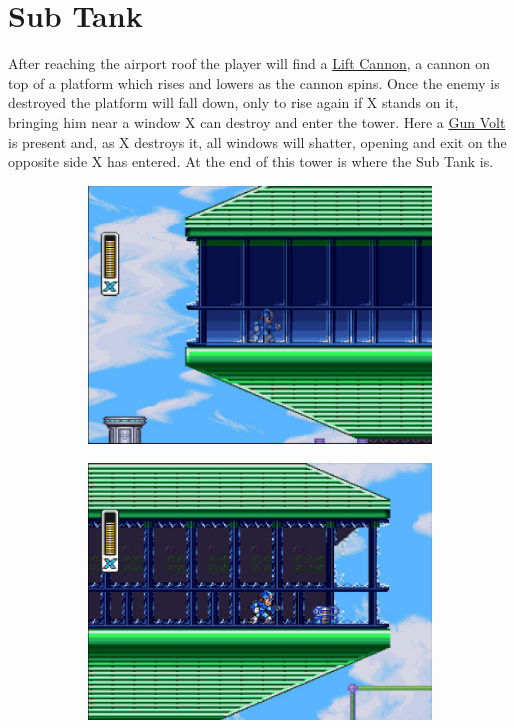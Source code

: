 \section{Sub Tank}
After reaching the airport roof the player will find a 	\hyperlink{enem:Lift_Cannon}{Lift Cannon}, a cannon on top of a platform which rises and lowers as the cannon spins. Once the enemy is destroyed the platform will fall down, only to rise again if X stands on it, bringing him near a window X can destroy and enter the tower. Here a \hyperlink{enem:Gun_Volt}{Gun Volt} is present and, as X destroys it, all windows will shatter, opening and exit on the opposite side X has entered. At the end of this tower is where the Sub Tank is. 

\begin{figure}[htp]
	\centering
	\begin{subfigure}{0.4\linewidth}
		\centering
		\includegraphics[width=\linewidth]{figures/X1/Storm_eagle/Storm_tank_1.jpg}
		\caption{}
	\end{subfigure}
	\begin{subfigure}{0.4\linewidth}
		\centering
		\includegraphics[width=\linewidth]{figures/X1/Storm_eagle/Storm_tank_2.jpg}

\end{subfigure}
\end{figure}
